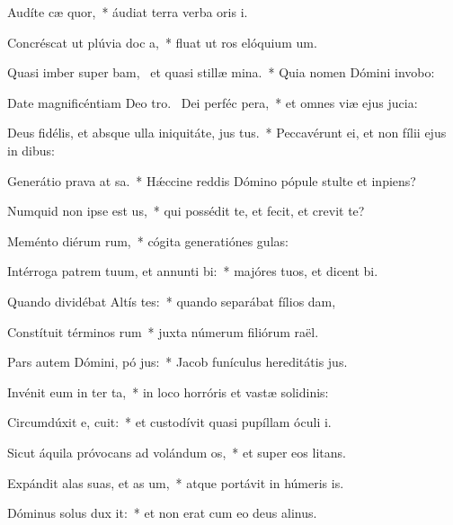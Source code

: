 \item Audíte cæ  quor,~* áudiat terra verba oris i.
\item Concréscat ut plúvia doc a,~* fluat ut ros elóquium um.
\item Quasi imber super bam,~\pscross{} et quasi stillæ  mina.~* Quia nomen Dómini invobo:
\item Date magnificéntiam Deo tro.~\pscross{} Dei perféc  pera,~* et omnes viæ ejus jucia:
\item Deus fidélis, et absque ulla iniquitáte, jus  tus.~* Peccavérunt ei, et non fílii ejus in dibus:
\item Generátio prava at sa.~* Hǽccine reddis Dómino pópule stulte et inpiens?
\item Numquid non ipse est  us,~* qui possédit te, et fecit, et crevit te?
\item Meménto diérum rum,~* cógita generatiónes gulas:
\item Intérroga patrem tuum, et annunti bi:~* majóres tuos, et dicent bi.
\item Quando dividébat Altís tes:~* quando separábat fílios dam,
\item Constítuit términos rum~* juxta númerum filiórum raël.
\item Pars autem Dómini, pó jus:~* Jacob funículus hereditátis jus.
\item Invénit eum in ter ta,~* in loco horróris et vastæ solidinis:
\item Circumdúxit e,  cuit:~* et custodívit quasi pupíllam óculi i.
\item Sicut áquila próvocans ad volándum  os,~* et super eos litans.
\item Expándit alas suas, et as um,~* atque portávit in húmeris is.
\item Dóminus solus dux  it:~* et non erat cum eo deus alinus.
